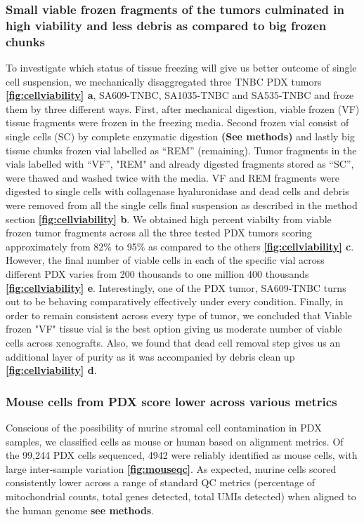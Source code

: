 \subsubsection{Small viable frozen fragments of the tumors culminated in high viability and less debris as compared to big frozen chunks}
To investigate which status of tissue freezing will give us better outcome of single cell suspension, we mechanically disaggregated three TNBC PDX tumors \textbf{\autoref{fig:cellviability} a}, SA609-TNBC, SA1035-TNBC and SA535-TNBC and froze them by three different ways. First, after mechanical digestion, viable frozen (VF) tissue fragments were frozen in the freezing media. Second frozen vial consist of single cells (SC) by complete enzymatic digestion \textbf{(See methods)} and lastly big tissue chunks frozen vial labelled as ``REM'' (remaining). Tumor fragments in the vials labelled with ``VF'', "REM" and already digested fragments stored as ``SC'', were thawed and washed twice with the media. VF and REM fragments were digested to single cells with collagenase hyaluronidase and dead cells and debris were removed from all the single cells final suspension as described in the method section \textbf{\autoref{fig:cellviability} b}. We obtained high percent viabilty from viable frozen tumor fragments across all the three tested PDX tumors scoring approximately from 82\% to 95\% as compared to the others \textbf{\autoref{fig:cellviability} c}. However, the final number of viable cells in each of the specific vial across different PDX varies from 200 thousands to one million 400 thousands  \textbf{\autoref{fig:cellviability} e}. Interestingly, one of the PDX tumor, SA609-TNBC turns out to be behaving comparatively effectively under every condition. 
Finally, in order to  remain consistent across every type of tumor, we concluded that Viable frozen "VF" tissue vial is the best option giving us moderate number of viable cells across xenografts. Also, we found that dead cell removal step gives us an additional layer of purity as it was accompanied by debris clean up \textbf{\autoref{fig:cellviability} d}.

\subsubsection{Mouse cells from PDX score lower across various
metrics}
Conscious of the possibility of murine stromal cell contamination in PDX samples, we classified cells as mouse or human based on alignment metrics. Of the 99,244 PDX cells sequenced, 4942 were reliably identified as mouse cells, with large inter-sample variation \textbf{\autoref{fig:mouseqc}}. As expected, murine cells scored consistently lower across a range of standard QC metrics (percentage of mitochondrial counts, total genes detected, total \ac{UMIs} detected) when aligned to the human genome \textbf{see methods}.

